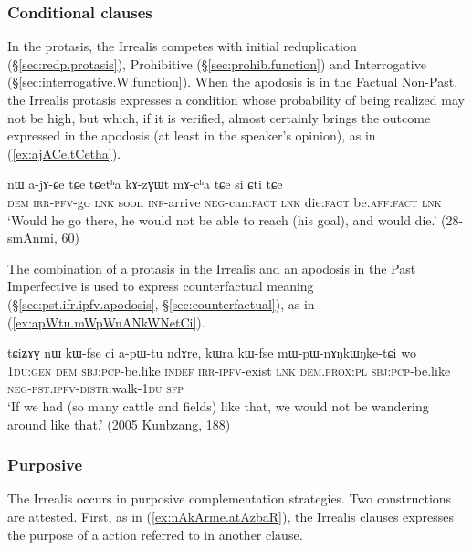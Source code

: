 \subsubsection{Conditional clauses} \label{sec:irrealis.conditional}
In the protasis, the Irrealis competes with initial reduplication (§\ref{sec:redp.protasis}), Prohibitive (§\ref{sec:prohib.function}) and Interrogative (§\ref{sec:interrogative.W.function}). When the apodosis is in the Factual Non-Past, the Irrealis protasis expresses a condition whose probability of being realized may not be high, but which, if it is verified, almost certainly brings the outcome expressed in the apodosis (at least in the speaker's opinion), as in (\ref{ex:ajACe.tCetha}).

\begin{exe}
\ex \label{ex:ajACe.tCetha}
\gll nɯ a-jɤ-ɕe tɕe tɕetʰa kɤ-zɣɯt mɤ-cʰa tɕe si ɕti tɕe \\
\textsc{dem} \textsc{irr}-\textsc{pfv}-go \textsc{lnk} soon \textsc{inf}-arrive \textsc{neg}-can:\textsc{fact} \textsc{lnk} die:\textsc{fact} be.\textsc{aff}:\textsc{fact} \textsc{lnk} \\
\glt `Would he go there, he would not be able to reach (his goal), and would die.' (28-smAnmi, 60)
\end{exe}

The combination of a protasis in the Irrealis and an apodosis in the Past Imperfective is used to express counterfactual meaning (§\ref{sec:pst.ifr.ipfv.apodosis}, §\ref{sec:counterfactual}), as in (\ref{ex:apWtu.mWpWnANkWNetCi}).

\begin{exe}
\ex \label{ex:apWtu.mWpWnANkWNetCi}
\gll tɕiʑɤɣ nɯ kɯ-fse ci a-pɯ-tu ndɤre, kɯra kɯ-fse mɯ-pɯ-nɤŋkɯŋke-tɕi wo \\
\textsc{1du}:\textsc{gen} \textsc{dem} \textsc{sbj}:\textsc{pcp}-be.like \textsc{indef} \textsc{irr}-\textsc{ipfv}-exist \textsc{lnk} \textsc{dem}.\textsc{prox}:\textsc{pl} \textsc{sbj}:\textsc{pcp}-be.like \textsc{neg}-\textsc{pst}.\textsc{ipfv}-\textsc{distr}:walk-\textsc{1du} \textsc{sfp} \\
\glt `If we had (so many cattle and fields) like that, we would not be wandering around like that.' (2005 Kunbzang, 188)
\end{exe}


\subsubsection{Purposive} \label{sec:irrealis.purposive}
The Irrealis occurs in purposive complementation strategies. Two constructions are attested. First, as in (\ref{ex:nAkArme.atAzbaR}), the Irrealis clauses expresses the purpose of a action referred to in another clause.

